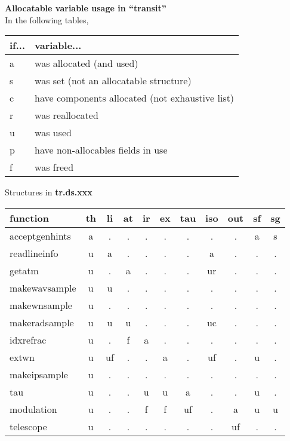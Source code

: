 \documentclass{article}
\begin{document}
\begin{center}
{\large {\bf Allocatable variable usage in ``transit''}}\\
\vfill
In the following tables, \\
\begin{tabular}{ll}
if... & variable...\\
\hline
a & was allocated (and used) \\
s & was set (not an allocatable structure)\\
c & have components allocated (not exhaustive list) \\
r & was reallocated \\
u & was used \\
p & have non-allocables fields in use \\
f & was freed \\
\end{tabular}
\end{center}

\vfill

\begin{center}
{\large Structures in {\bf tr.ds.xxx}}\\[.5cm]
\begin{tabular}{l|cccccccccc}
function
  & th & li & at & ir & ex & tau & iso & out & sf & sg \\
\hline
acceptgenhints
  & a  & .  & .  & .  & .  & .   & .   & .   & a  & s  \\
readlineinfo
  & u  & a  & .  & .  & .  & .   & a   & .   & .  & .  \\
getatm
  & u  & .  & a  & .  & .  & .   & ur  & .   & .  & .  \\
makewavsample
  & u  & u  & .  & .  & .  & .   & .   & .   & .  & .  \\
makewnsample
  & u  & .  & .  & .  & .  & .   & .   & .   & .  & .  \\
makeradsample
  & u  & u  & u  & .  & .  & .   & uc  & .   & .  & .  \\
idxrefrac
  & u  & .  & f  & a  & .  & .   & .   & .   & .  & .  \\
extwn
  & u  & uf & .  & .  & a  & .   & uf  & .   & u  & .  \\
makeipsample
  & u  & .  & .  & .  & .  & .   & .   & .   & .  & .  \\
tau
  & u  & .  & .  & u  & u  & a   & .   & .   & u  & .  \\
modulation
  & u  & .  & .  & f  & f  & uf  & .   & a   & u  & u  \\
telescope
  & u  & .  & .  & .  & .  & .   & .   & uf  & .  & .  \\
\hline
\end{tabular}
\end{center}
\end{document}
